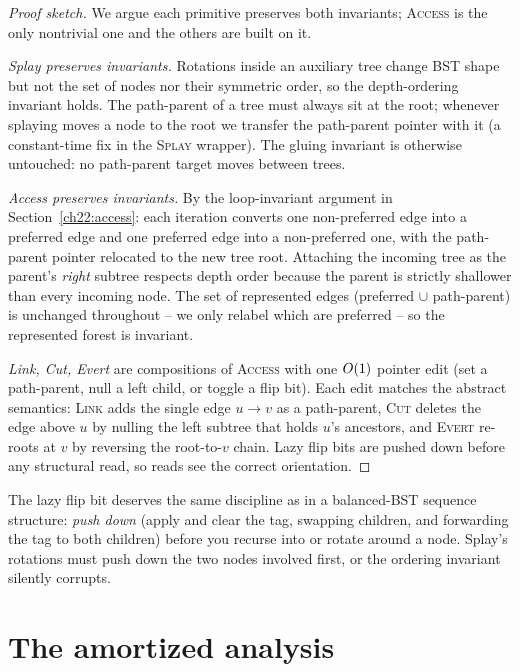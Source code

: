 \begin{proof}[Proof sketch]
We argue each primitive preserves both invariants; \textsc{Access} is the only
nontrivial one and the others are built on it.

\emph{Splay preserves invariants.} Rotations inside an auxiliary tree change BST
shape but not the set of nodes nor their symmetric order, so the depth-ordering
invariant holds. The path-parent of a tree must always sit at the root; whenever
splaying moves a node to the root we transfer the path-parent pointer with it (a
constant-time fix in the \textsc{Splay} wrapper). The gluing invariant is
otherwise untouched: no path-parent target moves between trees.

\emph{Access preserves invariants.} By the loop-invariant argument in
Section~\ref{ch22:access}: each iteration converts one non-preferred edge into a preferred edge and
one preferred edge into a non-preferred one, with the path-parent pointer
relocated to the new tree root. Attaching the incoming tree as the parent's
\emph{right} subtree respects depth order because the parent is strictly
shallower than every incoming node. The set of represented edges (preferred
$\cup$ path-parent) is unchanged throughout -- we only relabel which are
preferred -- so the represented forest is invariant.

\emph{Link, Cut, Evert} are compositions of \textsc{Access} with one $O(1)$
pointer edit (set a path-parent, null a left child, or toggle a flip bit). Each
edit matches the abstract semantics: \textsc{Link} adds the single edge
$u\!\to\!v$ as a path-parent, \textsc{Cut} deletes the edge above $u$ by nulling
the left subtree that holds $u$'s ancestors, and \textsc{Evert} re-roots at $v$
by reversing the root-to-$v$ chain. Lazy flip bits are
pushed down before any structural read, so reads see the correct orientation.
\end{proof}

\begin{remark}
The lazy flip bit deserves the same discipline as in a balanced-BST sequence
structure: \emph{push down} (apply and clear the tag, swapping children, and
forwarding the tag to both children) before you recurse into or rotate around a
node. Splay's rotations must push down the two nodes involved first, or the
ordering invariant silently corrupts.
\end{remark}

\section{The amortized analysis}
\label{ch22:analysis}

